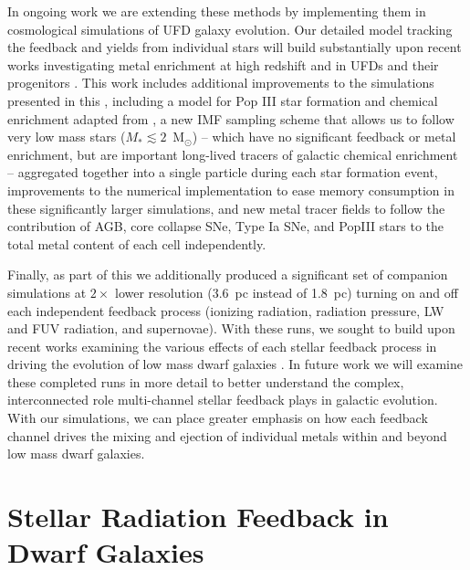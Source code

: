 In ongoing work we are extending these methods by implementing them in cosmological simulations of UFD galaxy evolution. Our detailed model tracking the feedback and yields from individual stars will build substantially upon recent works investigating metal enrichment at high redshift and in UFDs and their progenitors \citep[e.g.][]{Ritter2015,Jeon2017,Corlies2018,Wheeler2018,Agertz2019}. This work includes additional improvements to the simulations presented in this \dissertation, including a model for Pop III star formation and chemical enrichment adapted from \cite{Wise2012a}, a new IMF sampling scheme that allows us to follow very low mass stars ($M_* \lesssim 2$~M$_{\odot}$) -- which have no significant feedback or metal enrichment, but are important long-lived tracers of galactic chemical enrichment -- aggregated together into a single particle during each star formation event, improvements to the numerical implementation to ease memory consumption in these significantly larger simulations, and new metal tracer fields to follow the contribution of AGB, core collapse SNe, Type Ia SNe, and PopIII stars to the total metal content of each cell independently.

Finally, as part of this \dissertation we additionally produced a significant set of companion simulations at $2 \times$ lower resolution (3.6~pc instead of 1.8~pc) turning on and off each independent feedback process (ionizing radiation, radiation pressure, LW and FUV radiation, and supernovae). With these runs, we sought to build upon recent works examining the various effects of each stellar feedback process in driving the evolution of low mass dwarf galaxies \citep{Hu2016,Hu2017,Hu2018,Forbes2016}. In future work we will examine these completed runs in more detail to better understand the complex, interconnected role multi-channel stellar feedback plays in galactic evolution. With our simulations, we can place greater emphasis on how each feedback channel drives the mixing and ejection of individual metals within and beyond low mass dwarf galaxies.

\section{Stellar Radiation Feedback in Dwarf Galaxies}
\label{conclusion:sec:ch2}

